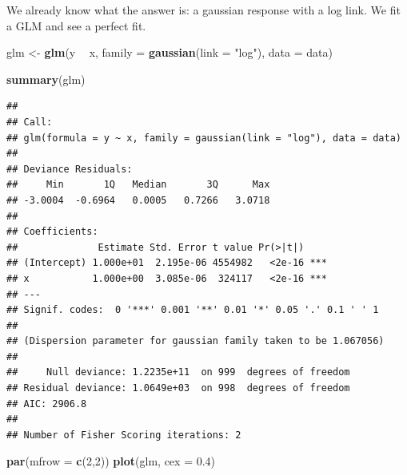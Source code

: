\documentclass[openany]{book}
\newenvironment{Shaded}{\begin{snugshade}}{\end{snugshade}}
\newcommand{\DataTypeTok}[1]{\textcolor[rgb]{0.13,0.29,0.53}{#1}}
\newcommand{\DecValTok}[1]{\textcolor[rgb]{0.00,0.00,0.81}{#1}}
\newcommand{\FloatTok}[1]{\textcolor[rgb]{0.00,0.00,0.81}{#1}}
\newcommand{\KeywordTok}[1]{\textcolor[rgb]{0.13,0.29,0.53}{\textbf{#1}}}
\newcommand{\NormalTok}[1]{#1}
\newcommand{\OperatorTok}[1]{\textcolor[rgb]{0.81,0.36,0.00}{\textbf{#1}}}
\newcommand{\StringTok}[1]{\textcolor[rgb]{0.31,0.60,0.02}{#1}}
\begin{document}
\begin{Shaded}
\end{Shaded}

We already know what the answer is: a gaussian response with a log link. We fit a GLM and see a perfect fit.

\begin{Shaded}
\begin{Highlighting}[]
\NormalTok{glm <-}\StringTok{ }\KeywordTok{glm}\NormalTok{(y }\OperatorTok{~}\StringTok{ }\NormalTok{x, }\DataTypeTok{family =} \KeywordTok{gaussian}\NormalTok{(}\DataTypeTok{link =} \StringTok{"log"}\NormalTok{), }\DataTypeTok{data =}\NormalTok{ data)}

\KeywordTok{summary}\NormalTok{(glm)}
\end{Highlighting}
\end{Shaded}

\begin{verbatim}
## 
## Call:
## glm(formula = y ~ x, family = gaussian(link = "log"), data = data)
## 
## Deviance Residuals: 
##     Min       1Q   Median       3Q      Max  
## -3.0004  -0.6964   0.0005   0.7266   3.0718  
## 
## Coefficients:
##              Estimate Std. Error t value Pr(>|t|)    
## (Intercept) 1.000e+01  2.195e-06 4554982   <2e-16 ***
## x           1.000e+00  3.085e-06  324117   <2e-16 ***
## ---
## Signif. codes:  0 '***' 0.001 '**' 0.01 '*' 0.05 '.' 0.1 ' ' 1
## 
## (Dispersion parameter for gaussian family taken to be 1.067056)
## 
##     Null deviance: 1.2235e+11  on 999  degrees of freedom
## Residual deviance: 1.0649e+03  on 998  degrees of freedom
## AIC: 2906.8
## 
## Number of Fisher Scoring iterations: 2
\end{verbatim}

\begin{Shaded}
\begin{Highlighting}[]
\KeywordTok{par}\NormalTok{(}\DataTypeTok{mfrow =} \KeywordTok{c}\NormalTok{(}\DecValTok{2}\NormalTok{,}\DecValTok{2}\NormalTok{))}
\KeywordTok{plot}\NormalTok{(glm, }\DataTypeTok{cex =} \FloatTok{0.4}\NormalTok{)}
\end{Highlighting}
\end{Shaded}
\end{document}

